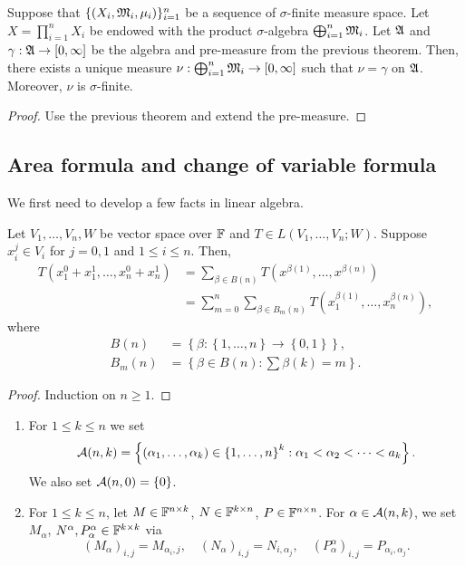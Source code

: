 \documentclass[a4paper]{article}
\begin{document}
\begin{cor}
Suppose that $\{(X_i, \mathfrak{M}_i, \mu_i)\}_{i=1}^n$ be 
a sequence of $\sigma$-finite measure space. 
Let $X = \prod_{i=1}^n X_i$ be endowed with the product 
$\sigma$-algebra $\bigoplus_{i=1}^n \mathfrak{M}_i$. Let $\mathfrak{A}$
and $\gamma: \mathfrak{A} \to [0, \infty]$ be the algebra and 
pre-measure from the previous theorem. Then, there 
exists a unique measure $\nu: \bigoplus_{i=1}^n \mathfrak{M}_i
\to [0, \infty]$ such that $\nu = \gamma$ on $\mathfrak{A}$.
Moreover, $\nu$ is $\sigma$-finite.
\end{cor}

\begin{proof}
Use the previous theorem and extend the pre-measure.
\end{proof}

\subsection{Area formula and change of variable formula}

We first need to develop a few facts in linear algebra.

\begin{prop}
Let $V_1, \dots, V_n, W$ be vector space over $\mathbb{F}$ 
and $T \in L(V_1, \dots, V_n ; W)$. Suppose $x_i^j \in V_i$
for $j = 0, 1$ and $1 \leq i \leq n$. Then, 
\[
\begin{aligned}
  T(x^0_1 + x^1_1, \dots, x^0_n + x^1_n)
  &= \sum_{\beta \in B(n)} 
  T(x^{\beta(1)}, \dots, x^{\beta(n)}) \\
  &= \sum_{m=0}^n \sum_{\beta \in B_m(n)} 
  T(x_1^{\beta(1)}, \dots, x_n^{\beta(n)}),
\end{aligned}
\]
where 
\[
\begin{aligned}
  B(n) &= \left\{ \beta : \left\{ 1, \dots, n \right\} 
  \to \left\{ 0, 1 \right\} \right\}, \\
  B_m(n) &= \left\{ \beta \in B(n) : 
  \sum \beta(k) = m \right\}.
\end{aligned}
\]
\end{prop}

\begin{proof}
Induction on $n \geq 1$.
\end{proof}

\begin{defi}
\begin{enumerate}
\item For $1 \leq k \leq n$ we set 
\[
\mathcal{A}(n, k) = \left\{ (\alpha_1, \dots, \alpha_k)  
\in \left\{ 1, \dots, n \right\}^k : 
\alpha_1 < \alpha_2 < \dots < a_k \right\}.
\]
We also set $\mathcal{A}(n, 0) = \left\{ 0 \right\}$. 

\item For $1 \leq k \leq n$, let $M \in \mathbb{F}^{n \times k}$, 
$N \in \mathbb{F}^{k \times n}$, $P \in \mathbb{F}^{n \times n}$. For 
$\alpha \in \mathcal{A}(n, k)$, we set 
$M_\alpha$, $N^\alpha, P_\alpha^\alpha \in \mathbb{F}^{k \times k}$
via 
\[
(M_\alpha)_{i, j} = M_{\alpha_i, j}, \quad 
(N_\alpha)_{i, j} = N_{i, \alpha_j}, \quad 
(P_\alpha^\alpha)_{i, j} = P_{\alpha_i, \alpha_j}.
\]
\end{enumerate}
\end{defi}
\end{document}
